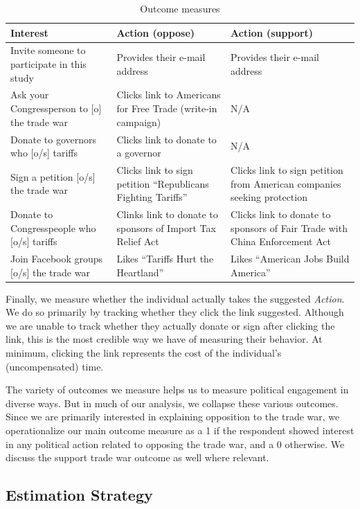\documentclass{article}
\begin{document}
\begin{table}[]
    \caption{Outcome measures}
    \label{tab:outcomes}
    \centering
    \begin{tabular}{p{5cm}|p{5cm}|p{5cm}}
    Interest & Action (oppose) & Action (support) \\
    \hline
      Invite someone to participate in this study & Provides their e-mail address & Provides their e-mail address \\
       Ask your Congressperson to [o] the trade war  & Clicks link to Americans for Free Trade (write-in campaign) & N/A \\
       Donate to governors who [o/s] tariffs & Clicks link to donate to a governor & N/A \\
       Sign a petition [o/s] the trade war & Clicks link to sign petition ``Republicans Fighting Tariffs'' & Clicks link to sign petition from American companies seeking protection \\
       Donate to Congresspeople who [o/s] tariffs & Clinks link to donate to sponsors of Import Tax Relief Act & Clicks link to donate to sponsors of Fair Trade with China Enforcement Act\\
       Join Facebook groups [o/s] the trade war & Likes ``Tariffs Hurt the Heartland'' & Likes ``American Jobs Build America'' \\
    \end{tabular}
\end{table}

Finally, we measure whether the individual actually takes the suggested \textit{Action}. We do so primarily by tracking whether they click the link suggested. Although we are unable to track whether they actually donate or sign after clicking the link, this is the most credible way we have of measuring their behavior. At minimum, clicking the link represents the cost of the individual's (uncompensated) time.

The variety of outcomes we measure helps us to measure political engagement in diverse ways. But in much of our analysis, we collapse these various outcomes. Since we are primarily interested in explaining opposition to the trade war, we operationalize our main outcome measure as a 1 if the respondent showed interest in any political action related to opposing the trade war, and a 0 otherwise. We discuss the support trade war outcome as well where relevant.

\subsection{Estimation Strategy}
\end{document}
